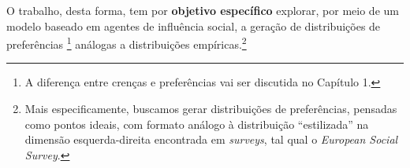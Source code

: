 O trabalho, desta forma, tem por \textbf{objetivo específico} explorar, por meio
de um modelo baseado em agentes de influência social, a geração de distribuições
de preferências \footnote{A diferença entre crenças e preferências vai ser
  discutida no Capítulo 1.} análogas a distribuições empíricas.\footnote{Mais
  especificamente, buscamos gerar distribuições de preferências, pensadas como
  pontos ideais, com formato análogo à distribuição ``estilizada'' na dimensão
  esquerda-direita encontrada em \textit{surveys}, tal qual o \textit{European
    Social Survey}.}





